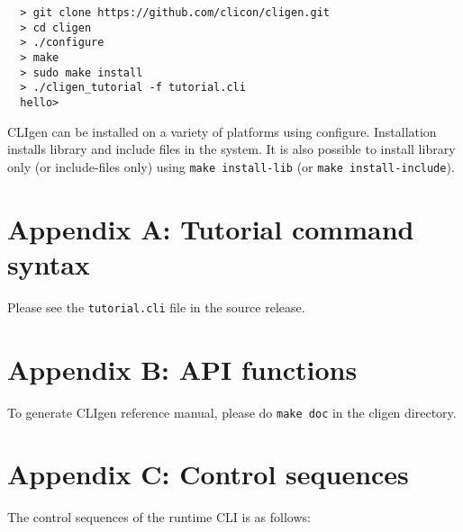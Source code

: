 \documentclass[a4paper, 10pt] {article}
\begin{document}
\begin{verbatim}
  > git clone https://github.com/clicon/cligen.git
  > cd cligen
  > ./configure
  > make
  > sudo make install
  > ./cligen_tutorial -f tutorial.cli
  hello>
\end{verbatim}

CLIgen can be installed on a variety of platforms using
configure. Installation installs library and include files in the
system. It is also possible to install library only (or include-files
only) using {\tt make install-lib} (or {\tt make install-include}).

\normalsize

\newpage
\section*{Appendix A: Tutorial command syntax}
\label{app:syntax}

Please see the {\tt tutorial.cli} file in the source release.


\newpage
\section*{Appendix B: API functions}
\label{app:functions}

To generate CLIgen reference manual, please do {\tt make doc} in the cligen directory.

\newpage
\section*{Appendix C: Control sequences}
\label{app:control}
The control sequences of the runtime CLI is as follows:
\end{document}
